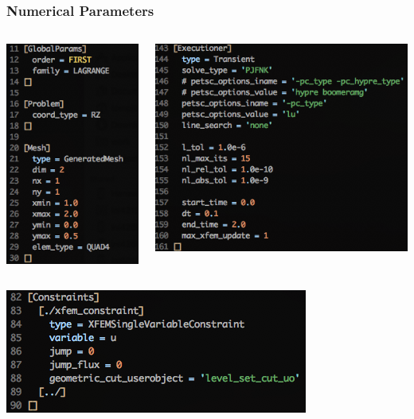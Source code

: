 \documentclass[]{beamer}
\begin{document}
\begin{frame}\frametitle{Numerical Parameters}
  	\begin{columns}
			\begin{center}
			\includegraphics[scale=0.4]{figures/1D_rz_h1m/Screen-GlobalParams-1Drzh1m}
			\end{center}
			\begin{center}
			\includegraphics[scale=0.4]{figures/1D_rz_h1m/Screen-Executioner-1Drzh1m}
			\end{center}
	\end{columns}
	\begin{center}
	\includegraphics[scale=0.4]{figures/1D_rz_h1m/Screen-Constraints-1Drzh1m}
	\end{center}
\end{frame}
\end{document}
